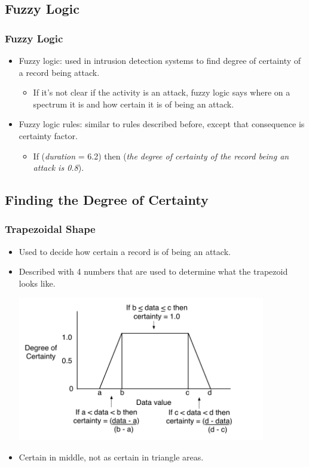 \documentclass{beamer}
\newcommand{\linespace}{\vskip 0.25cm}
\begin{document}
\subsection{Fuzzy Logic}
\begin{frame}
	\frametitle{Fuzzy Logic}
	\begin{itemize}
		\item Fuzzy logic: used in intrusion detection systems to find degree of certainty of a record being attack.
			\begin{itemize}
				\item If it's not clear if the activity is an attack, fuzzy logic says where on a spectrum it is and how certain it is of being an attack.
			\end{itemize}
		\linespace
		\linespace
		\linespace
		\item Fuzzy logic rules: similar to rules described before, except that
consequence is certainty factor. 
		\begin{itemize}
			\item If (\emph{duration} = 6.2) then (\emph{the degree of certainty of the record being an attack is 0.8}).
		\end{itemize}
	\end{itemize}
\end{frame}

\subsection{Finding the Degree of Certainty}
\begin{frame}
  \frametitle{Trapezoidal Shape}
	\begin{itemize}
		\item Used to decide how certain a record is of being an attack.
		\item Described with 4 numbers that are used to determine what the trapezoid looks like.
		\begin{center}
		  \includegraphics[width=0.85\textwidth]{../trapFigTemplate.pdf}		
		\end{center}
		\item Certain in middle, not as certain in triangle areas.
	\end{itemize}
\end{frame}
\end{document}

